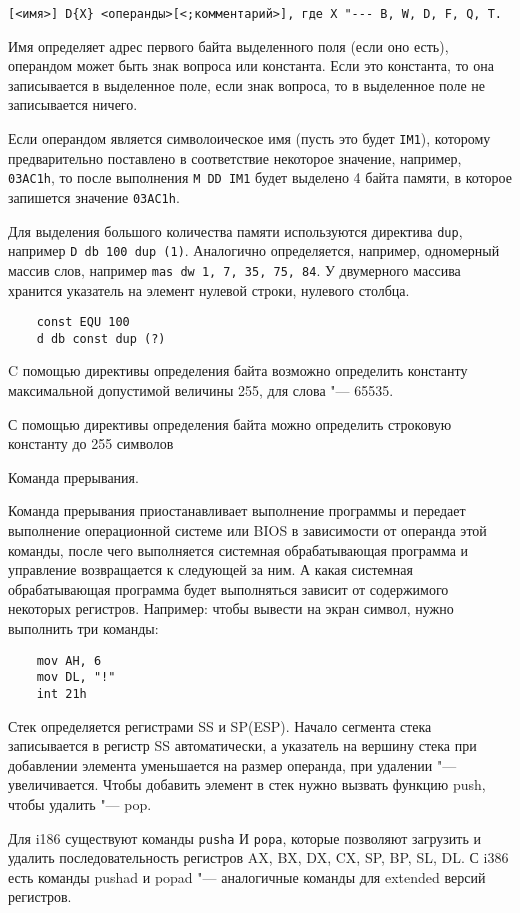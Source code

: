 \verb|[<имя>] D{X} <операнды>[<;комментарий>], где X "--- B, W, D, F, Q, T.|

Имя определяет адрес первого байта выделенного поля (если оно есть), операндом может быть знак вопроса
или константа. Если это константа, то она записывается в выделенное поле, если знак вопроса, то в выделенное поле не записывается ничего.

Если операндом является символоическое имя (пусть это будет \verb|IM1|), которому предварительно поставлено
в соответствие некоторое значение, например, \verb|03AC1h|, то после выполнения
\verb|M DD IM1| будет выделено 4 байта памяти, в которое запишется значение \verb|03AC1h|.

Для выделения большого количества памяти используются директива \verb|dup|, например \verb|D db 100 dup (1)|.
Аналогично определяется, например, одномерный массив слов, например \verb|mas dw 1, 7, 35, 75, 84|.
У двумерного массива хранится указатель на элемент нулевой строки, нулевого столбца.

\begin{verbatim}
    const EQU 100
    d db const dup (?)    
\end{verbatim}


C помощью директивы определения байта возможно определить константу максимальной допустимой величины 255, для слова "--- 65535.

С помощью директивы определения байта можно определить строковую константу до 255 символов

Команда прерывания.

Команда прерывания приостанавливает выполнение программы и передает выполнение операционной системе
или BIOS в зависимости от операнда этой команды, после чего выполняется системная обрабатывающая программа
и управление возвращается к следующей за ним. А какая системная обрабатывающая программа будет выполняться
зависит от содержимого некоторых регистров. Например: чтобы вывести на экран символ, нужно выполнить три команды:
\begin{verbatim}
    mov AH, 6
    mov DL, "!"
    int 21h    
\end{verbatim}
Стек определяется регистрами SS и SP(ESP).
Начало сегмента стека записывается в регистр SS автоматически, 
а указатель на вершину стека при добавлении элемента уменьшается на размер операнда, при удалении
"--- увеличивается. Чтобы добавить элемент в стек нужно вызвать функцию push, чтобы удалить "--- pop.

Для i186 существуют команды \verb|pusha| И \verb|popa|, которые позволяют загрузить и удалить последовательность регистров
AX, BX, DX, CX, SP, BP, SL, DL. С i386 есть команды pushad и popad "--- аналогичные команды для extended версий
регистров.

